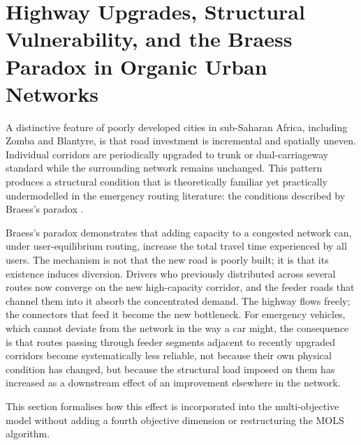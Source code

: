 
\section{Highway Upgrades, Structural Vulnerability, and the
         Braess Paradox in Organic Urban Networks}
\label{sec:braess}

A distinctive feature of poorly developed cities in sub-Saharan Africa,
including Zomba and Blantyre, is that road investment is incremental and
spatially uneven. Individual corridors are periodically upgraded to trunk
or dual-carriageway standard while the surrounding network remains
unchanged. This pattern produces a structural condition that is
theoretically familiar yet practically undermodelled in the emergency
routing literature: the conditions described by Braess's paradox
\cite{braess1968}.

Braess's paradox demonstrates that adding capacity to a congested network
can, under user-equilibrium routing, increase the total travel time
experienced by all users. The mechanism is not that the new road is
poorly built; it is that its existence induces diversion. Drivers who
previously distributed across several routes now converge on the new
high-capacity corridor, and the feeder roads that channel them into it
absorb the concentrated demand. The highway flows freely; the connectors
that feed it become the new bottleneck. For emergency vehicles, which
cannot deviate from the network in the way a car might, the consequence
is that routes passing through feeder segments adjacent to recently
upgraded corridors become systematically less reliable, not because their
own physical condition has changed, but because the structural load
imposed on them has increased as a downstream effect of an improvement
elsewhere in the network.

This section formalises how this effect is incorporated into the
multi-objective model without adding a fourth objective dimension or
restructuring the MOLS algorithm.

